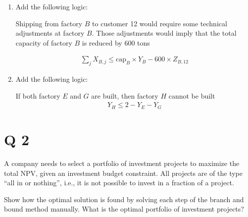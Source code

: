 \documentclass[10pt]{article}
\begin{document}
\begin{enumerate}
    Iff. products are shipped from a given factory (factory $D $) to a given customer ($7 $), then the quantity shipped from $D $ to 7 must be above 3,000 tons. 

    \begin{gather*}
        X_{D, 7} \ge 3000 \times Z_{D, 7} 
    \end{gather*}
    \item Add the following logic: 

    Shipping from factory $B $ to customer 12 would require some technical adjustments at factory $B $. Those adjustments would imply that the total capacity of factory $B $ is reduced by 600 tons 

    \begin{gather*}
        \sum_j X_{B, j}\le \text{cap}_B\times Y_B - 600\times Z_{B, 12}
    \end{gather*}
    \item Add the following logic: 

    If both factory $E $ and $G $ are built, then factory $H $ cannot be built
    \begin{gather*}
        Y_H \le 2 - Y_E - Y_G
    \end{gather*}
\end{enumerate}
\newpage 
\section{Q 2}
A company needs to select a portfolio of investment projects to maximize the total NPV, given an investment budget constraint. All projects are of the type ``all in or nothing'', i.e., it is not possible to invest in a fraction of a project. 

Show how the optimal solution is found by solving each step of the branch and bound method manually. What is the optimal portfolio of investment projects?
\end{document}
